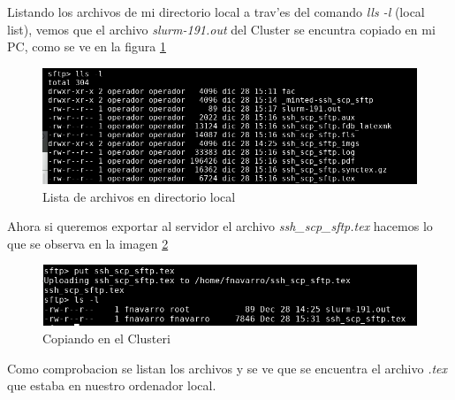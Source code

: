 \documentclass[a4paper]{scrartcl}
\begin{document}
Listando los archivos de mi directorio local a trav'es del comando \textit{lls -l} (local list), vemos que el archivo \textit{slurm-191.out} del Cluster se encuntra copiado en mi PC, como se ve en la figura \ref{fig:sftp_2}
\begin{figure}[!ht]
	\includegraphics[width=\columnwidth]{./ssh_scp_sftp_imgs/sftp_2}
	\caption{Lista de archivos en directorio local}
	\label{fig:sftp_2}

\end{figure}

Ahora si queremos exportar al servidor el archivo \textit{ssh\_scp\_sftp.tex} hacemos lo que se observa en la imagen \ref{fig:sftp_3}
\begin{figure}[!ht]
	\includegraphics[width=\columnwidth]{./ssh_scp_sftp_imgs/sftp_3}
	\caption{Copiando en el Clusteri}
	\label{fig:sftp_3}
\end{figure}

Como comprobacion se listan los archivos y se ve que se encuentra el archivo \textit{.tex} que estaba en nuestro ordenador local.
\end{document}
